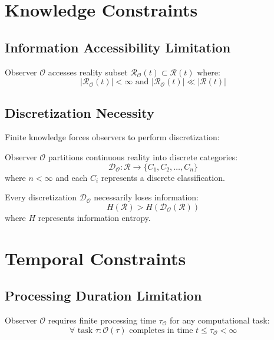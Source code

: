 \documentclass{article}
\begin{document}
\section{Knowledge Constraints}

\subsection{Information Accessibility Limitation}
\begin{definition}
Observer $\mathcal{O}$ accesses reality subset $\mathcal{R}_{\mathcal{O}}(t) \subset \mathcal{R}(t)$ where:
$$|\mathcal{R}_{\mathcal{O}}(t)| < \infty \text{ and } |\mathcal{R}_{\mathcal{O}}(t)| \ll |\mathcal{R}(t)|$$
\end{definition}

\subsection{Discretization Necessity}
Finite knowledge forces observers to perform discretization:

\begin{definition}
Observer $\mathcal{O}$ partitions continuous reality into discrete categories:
$$\mathcal{D}_{\mathcal{O}}: \mathcal{R} \rightarrow \{C_1, C_2, \ldots, C_n\}$$
where $n < \infty$ and each $C_i$ represents a discrete classification.
\end{definition}

\begin{theorem}
Every discretization $\mathcal{D}_{\mathcal{O}}$ necessarily loses information:
$$H(\mathcal{R}) > H(\mathcal{D}_{\mathcal{O}}(\mathcal{R}))$$
where $H$ represents information entropy.
\end{theorem}

\section{Temporal Constraints}

\subsection{Processing Duration Limitation}
\begin{definition}
Observer $\mathcal{O}$ requires finite processing time $\tau_{\mathcal{O}}$ for any computational task:
$$\forall \text{ task } \tau: \mathcal{O}(\tau) \text{ completes in time } t \leq \tau_{\mathcal{O}} < \infty$$
\end{definition}
\end{document}

